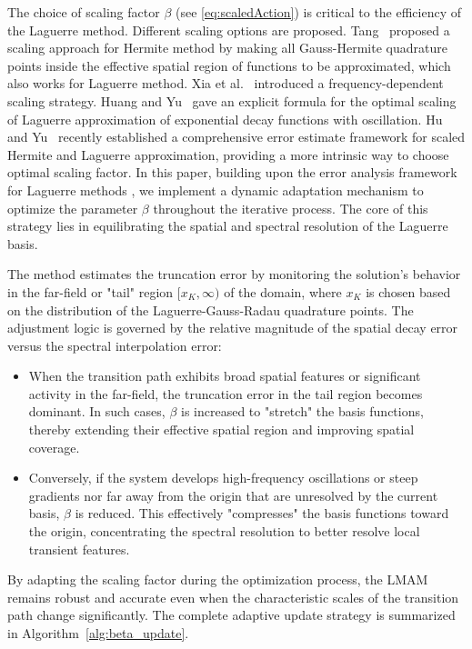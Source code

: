 \documentclass[a4paper,fleqn, 12pt]{cas-sc}
\numberwithin{table}{section}
\begin{document}
The choice of scaling factor $\beta$ (see \eqref{eq:scaledAction}) is critical to the efficiency of the Laguerre method. Different scaling options are proposed. Tang~\cite{tang_hermite_1993} proposed a scaling approach for Hermite method by making all Gauss-Hermite quadrature points inside the effective spatial region of functions to be approximated, which also works for Laguerre method. Xia et al.~\cite{XiaSC2021EfficientScaling} introduced a frequency-dependent scaling strategy. Huang and Yu~\cite{huang2024improved} gave an explicit formula for the optimal scaling of Laguerre approximation of exponential decay functions with oscillation. Hu and Yu~\cite{hu2026scaling,huscaling} recently established a comprehensive error estimate framework for scaled Hermite and Laguerre approximation, providing a more intrinsic way to choose optimal scaling factor.
In this paper, building upon the error analysis framework for Laguerre methods \citep{huscaling}, we implement a dynamic adaptation mechanism to optimize the parameter $\beta$ throughout the iterative process. The core of this strategy lies in equilibrating the spatial and spectral resolution of the Laguerre basis. 

The method estimates the truncation error by monitoring the solution's behavior in the far-field or "tail" region $[x_K, \infty)$ of the domain, where $x_K$ is chosen based on the distribution of the Laguerre-Gauss-Radau quadrature points. The adjustment logic is governed by the relative magnitude of the spatial decay error versus the spectral interpolation error:
\begin{itemize}
    \item When the transition path exhibits broad spatial features or significant activity in the far-field, the truncation error in the tail region becomes dominant. In such cases, $\beta$ is increased to "stretch" the basis functions, thereby extending their effective spatial region and improving spatial coverage.
    \item Conversely, if the system develops high-frequency oscillations or steep gradients nor far away from the origin that are unresolved by the current basis, $\beta$ is reduced. This effectively "compresses" the basis functions toward the origin, concentrating the spectral resolution to better resolve local transient features.
\end{itemize}
By adapting the scaling factor during the optimization process, the LMAM remains robust and accurate even when the characteristic scales of the transition path change significantly. The complete adaptive update strategy is summarized in Algorithm~\ref{alg:beta_update}.
\end{document}
